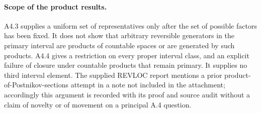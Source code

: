 \paragraph{Scope of the product results.}
A4.3 supplies a uniform set of representatives only after the set of
possible factors has been fixed.  It does not show that arbitrary
reversible generators in the primary interval are products of
countable spaces or are generated by such products.  A4.4 gives a
restriction on every proper interval class, and an explicit failure
of closure under countable products that remain primary.  It supplies
no third interval element.  The supplied REVLOC report mentions a
prior product-of-Postnikov-sections attempt in a note not included in
the attachment; accordingly this argument is recorded with its proof
and source audit without a claim of novelty or of movement on a
principal A.4 question.
